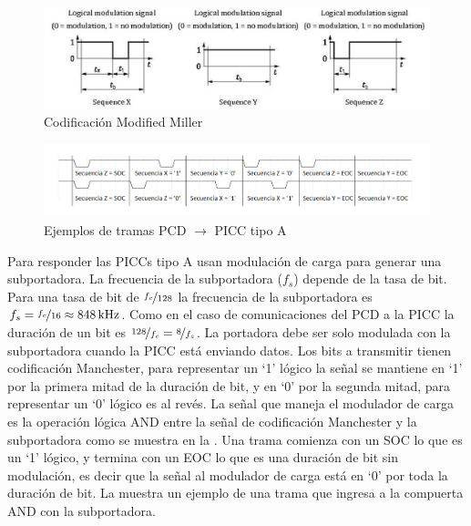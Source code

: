 \documentclass[a4paper, twoside, 11pt]{report}
\begin{document}
\begin{figure}[htb]
  \centering
  \includegraphics[scale=0.5]{./img/sequences}
  \caption{Codificación Modified Miller~\cite{iso14443-2}}
  \label{fig:sequences}
\end{figure}

\begin{figure}[htb]
  \centering
  \includegraphics[scale=0.45]{./img/rx_frame_examples}
  \caption{Ejemplos de tramas PCD $\rightarrow$ PICC tipo A}
  \label{fig:rx_frame_examples}
\end{figure}

\FloatBarrier

Para responder las PICCs tipo A usan modulación de carga para generar una subportadora.  La frecuencia de la subportadora ($f_s$) depende de la tasa de bit. Para una tasa de bit de $\nicefrac{f_c}{128}$ la frecuencia de la subportadora es $f_s = \nicefrac{f_c}{16} \approx \SI{848}{\kilo\hertz}$. Como en el caso de comunicaciones del PCD a la PICC la duración de un bit es $\nicefrac{128}{f_c} = \nicefrac{8}{f_s}$. La portadora debe ser solo modulada con la subportadora cuando la PICC está enviando datos. Los bits a transmitir tienen codificación Manchester, para representar un ‘1’ lógico la señal se mantiene en ‘1’ por la primera mitad de la duración de bit, y en ‘0’ por la segunda mitad, para representar un ‘0’ lógico es al revés. La señal que maneja el modulador de carga es la operación lógica AND entre la señal de codificación Manchester y la subportadora como se muestra en la . Una trama comienza con un SOC lo que es un ‘1’ lógico, y termina con un EOC lo que es una duración de bit sin modulación, es decir que la señal al modulador de carga está en ‘0’ por toda la duración de bit. La  muestra un ejemplo de una trama que ingresa a la compuerta AND con la subportadora.
\end{document}
